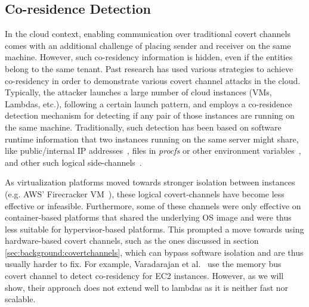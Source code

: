 \subsection{Co-residence Detection}
\label{sec:background:coresidence}

In the cloud context, enabling communication over traditional covert channels 
comes with an additional challenge of placing sender and 
receiver on the same machine. However,
such co-residency information is hidden, even if the entities belong to the same
tenant. Past research has used various strategies to achieve co-residency in order 
to demonstrate various covert channel attacks in the cloud. Typically, the
attacker launches a large number of cloud instances (VMs, Lambdas, etc.),
following a certain launch pattern, and employs a co-residence detection
mechanism for detecting if any pair of those instances are running on the same
machine. Traditionally, such detection has been based on software
runtime information that two instances running on the same server might share,
like public/internal IP addresses~\cite{ristenpartccs2009}, files in
\textit{procfs} or other environment variables~\cite{wangusenix2018,wuusenix2012}, 
and other such logical side-channels~\cite{varad191016,vmplacement}.

As virtualization platforms moved towards stronger isolation between instances
(e.g.  AWS' Firecracker VM~\cite{firecracker}), these logical covert-channels
have become less effective or infeasible. Furthermore, some of these channels
were only effective on container-based platforms that shared the underlying OS
image and were thus less suitable for hypervisor-based platforms.  This prompted
a move towards using hardware-based covert channels, such as the ones discussed
in section \ref{sec:background:covertchannels}, which can bypass software
isolation and are thus usually harder to fix. For example, Varadarajan et
al.~\cite{varadarajan2015} use the memory bus covert channel to detect
co-residency for EC2 instances.  However, as we will show, their approach does
not extend well to lambdas as it is neither fast nor scalable.


